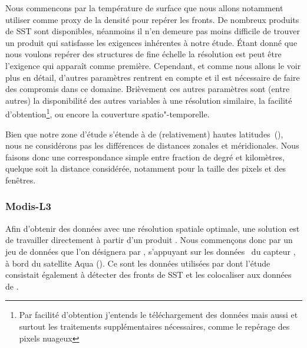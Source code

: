 Nous commencons par la température de surface que nous allons notamment utiliser comme proxy de la densité pour repérer les fronts.
De nombreux produits de SST sont disponibles, néanmoins il n'en demeure pas moins difficile de trouver un produit qui satisfasse les exigences inhérentes à notre étude.
Étant donné que nous voulons repérer des structures de fine échelle la résolution est peut être l’exigence qui apparaît comme première.
Cependant, et comme nous allons le voir plus en détail, d'autres paramètres rentrent en compte et il est nécessaire de faire des compromis dans ce domaine.
Brièvement ces autres paramètres sont (entre autres) la disponibilité des autres variables à une résolution similaire, la facilité d'obtention\footnote{%
  Par facilité d'obtention j'entends le téléchargement des données mais aussi et surtout les traitements supplémentaires nécessaires, comme le repérage des pixels nuageux },
ou encore la couverture spatio"-temporelle.

\begin{note}[label={note:approx-lat-km}]
  Bien que notre zone d'étude s'étende à de (relativement) hautes latitudes~(\tapprox{}), nous ne considérons pas les différences de distances zonales et méridionales.
  Nous faisons donc une correspondance simple entre fraction de degré et kilomètres, quelque soit la distance considérée, notamment pour la taille des pixels et des fenêtres.
\end{note}

\subsubsection{Modis-L3}

Afin d'obtenir des données avec une résolution spatiale optimale, une solution est de travailler directement à partir d'un produit .
Nous commençons donc par un jeu de données que l'on désignera par , s'appuyant sur les données~ du capteur , à bord du satellite Aqua (\cite{kilpatrick_2015}).
Ce sont les données utilisées par \textcite{liu_2016}  dont l'étude consistait également à détecter des fronts de SST et les colocaliser aux données de .

